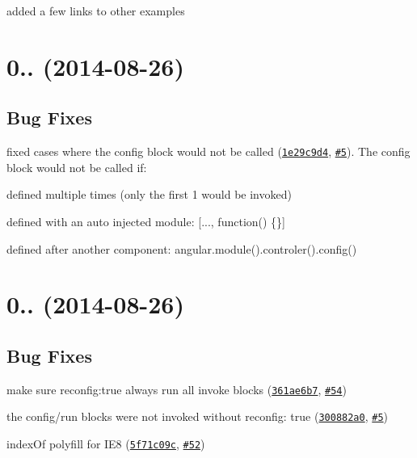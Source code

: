\begin{DoxyItemize}
\item added a few links to other examples
\end{DoxyItemize}

\label{_0.3.5}%
 \section*{0.. (2014-\/08-\/26)}

\subsection*{Bug Fixes}


\begin{DoxyItemize}
\item fixed cases where the config block would not be called (\href{https://github.com/ocombe/ocLazyLoad/commit/1e29c9d438d494cd053cd7533921e02e3fe5e5d0}{\tt 1e29c9d4}, \href{https://github.com/ocombe/ocLazyLoad/issues/5}{\tt \#5}). The config block would not be called if\+:
\begin{DoxyItemize}
\item defined multiple times (only the first 1 would be invoked)
\item defined with an auto injected module\+: \mbox{[}\textquotesingle{}...\textquotesingle{}, function() \{\}\mbox{]}
\item defined after another component\+: angular.\+module().controler().config()
\end{DoxyItemize}
\end{DoxyItemize}

\label{_0.3.4}%
 \section*{0.. (2014-\/08-\/26)}

\subsection*{Bug Fixes}


\begin{DoxyItemize}
\item make sure reconfig\+:true always run all invoke blocks (\href{https://github.com/ocombe/ocLazyLoad/commit/361ae6b7d319cb5ada1ab022a6761d4a67a31b58}{\tt 361ae6b7}, \href{https://github.com/ocombe/ocLazyLoad/issues/54}{\tt \#54})
\item the config/run blocks were not invoked without reconfig\+: true (\href{https://github.com/ocombe/ocLazyLoad/commit/300882a016e4f9d538e322be9718f21740048296}{\tt 300882a0}, \href{https://github.com/ocombe/ocLazyLoad/issues/5}{\tt \#5})
\item index\+Of polyfill for I\+E8 (\href{https://github.com/ocombe/ocLazyLoad/commit/5f71c09cad4255932e84c760b07d16a4a2b016d9}{\tt 5f71c09c}, \href{https://github.com/ocombe/ocLazyLoad/issues/52}{\tt \#52})
\end{DoxyItemize}

